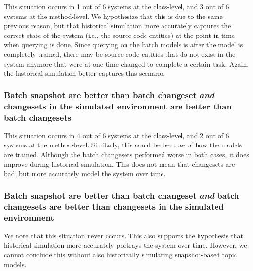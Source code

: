 %

This situation occurs in
1 out of 6 systems at the class-level, and
3 out of 6 systems at the method-level.
We hypothesize that this is due to the same previous reason, but that
historical simulation more accurately captures the correct state of the system (i.e., the source code entities)
at the point in time when querying is done.
Since querying on the batch models is after the model is completely trained,
there may be source code entities that do not exist in the system anymore
that were at one time changed to complete a certain task.
Again, the historical simulation better captures this scenario.

\subsubsection{Batch snapshot are better than batch changeset
\emph{and} changesets in the simulated environment are better than batch changesets}

%

This situation occurs in
4 out of 6 systems at the class-level, and
2 out of 6 systems at the method-level.
Similarly, this could be because of how the models are trained.
Although the batch changesets performed worse in both cases, it does
improve during historical simulation.
This does not mean that changesets are bad, but more accurately model
the system over time.

\subsubsection{Batch snapshot are better than batch changeset
\emph{and} batch changesets are better than changesets in the simulated environment}

%
%
We note that this situation never occurs.
This also supports the hypothesis that historical simulation more accurately portrays the system over time.
However, we cannot conclude this without also historically simulating snapshot-based topic models.
